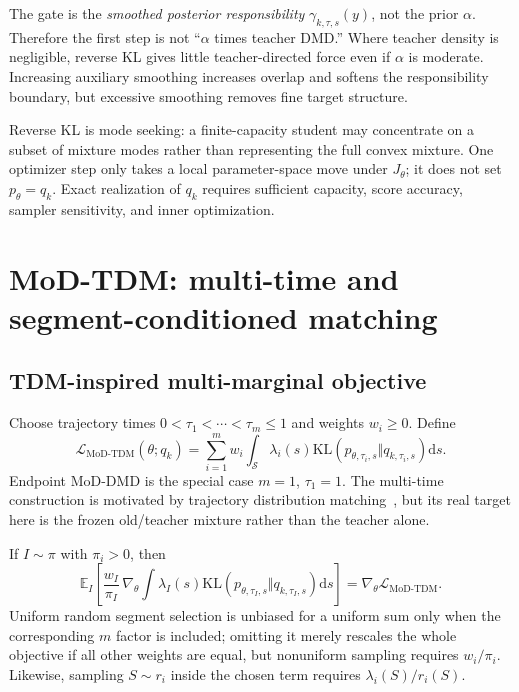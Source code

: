 \documentclass[11pt,a4paper]{article}
\newcommand{\E}{\mathbb{E}}
\newcommand{\KL}{\mathrm{KL}}
\newcommand{\dd}{\mathrm{d}}
\theoremstyle{plain}
\theoremstyle{definition}
\begin{document}
The gate is the \emph{smoothed posterior responsibility}
$\gamma_{k,\tau,s}(y)$, not the prior $\alpha$.  Therefore the first step is not
``$\alpha$ times teacher DMD.''  Where teacher density is negligible, reverse KL gives little
teacher-directed force even if $\alpha$ is moderate.  Increasing auxiliary smoothing increases
overlap and softens the responsibility boundary, but excessive smoothing removes fine target
structure.

Reverse KL is mode seeking: a finite-capacity student may concentrate on a subset of mixture
modes rather than representing the full convex mixture.  One optimizer step only takes a local
parameter-space move under $J_\theta$; it does not set $p_\theta=q_k$.  Exact realization of
$q_k$ requires sufficient capacity, score accuracy, sampler sensitivity, and inner optimization.

\section{MoD-TDM: multi-time and segment-conditioned matching}
\label{sec:mod-tdm}

\subsection{TDM-inspired multi-marginal objective}

Choose trajectory times $0<\tau_1<\cdots<\tau_m\le1$ and weights $w_i\ge0$.  Define
\begin{equation}
\mathcal L_{\mathrm{MoD\text{-}TDM}}(\theta;q_k)
=\sum_{i=1}^m w_i
\int_{\mathcal S}\lambda_i(s)
\KL\!\left(p_{\theta,\tau_i,s}\Vert q_{k,\tau_i,s}\right)\dd s.
\label{eq:mod-tdm-objective}
\end{equation}
Endpoint MoD-DMD is the special case $m=1$, $\tau_1=1$.
The multi-time construction is motivated by trajectory distribution matching~\cite{tdm}, but
its real target here is the frozen old/teacher mixture rather than the teacher alone.

If $I\sim\pi$ with $\pi_i>0$, then
\begin{equation}
\E_I\!\left[
\frac{w_I}{\pi_I}\,
\nabla_\theta\int\lambda_I(s)
\KL(p_{\theta,\tau_I,s}\Vert q_{k,\tau_I,s})\dd s
\right]
=\nabla_\theta\mathcal L_{\mathrm{MoD\text{-}TDM}}.
\label{eq:random-time-unbiased}
\end{equation}
Uniform random segment selection is unbiased for a uniform sum only when the corresponding
$m$ factor is included; omitting it merely rescales the whole objective if all other weights are
equal, but nonuniform sampling requires $w_i/\pi_i$.  Likewise, sampling
$S\sim r_i$ inside the chosen term requires $\lambda_i(S)/r_i(S)$.
\end{document}
